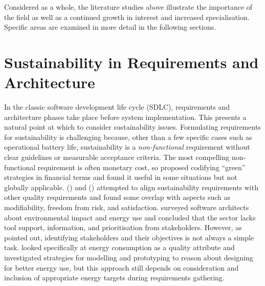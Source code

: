 Considered as a whole, the literature studies above illustrate the importance of the field as well as a continued growth in interest and increased specialisation. Specific areas are examined in more detail in the following sections.

\section{Sustainability in Requirements and Architecture}
\label{literature:requirements}

In the classic software development life cycle (SDLC), requirements and architecture phases take place before system implementation. This presents a natural point at which to consider sustainability issues. Formulating requirements for sustainability is challenging because, other than a few specific cases such as operational battery life, sustainability is a \emph{non-functional} requirement without clear guidelines or measurable acceptance criteria. The most compelling non-functional requirement is often monetary cost, so \citet{Gu2012} proposed codifying \enquote{green} strategies in financial terms and found it useful in some situations but not globally applicable. \citeauthor{Condori-Fernandez2018} (\citeyear{Condori-Fernandez2015}) and (\citeyear{Condori-Fernandez2018}) attempted to align sustainability requirements with other quality requirements and found some overlap with aspects such as modifiability, freedom from risk, and satisfaction. \citet{Bashroush2016} surveyed software architects about environmental impact and energy use and concluded that the sector lacks tool support, information, and prioritisation from stakeholders. However, as \citet{Penzenstadler2013a} pointed out, identifying stakeholders and their objectives is not always a simple task. \citet{Kazman2018} looked specifically at energy consumption as a quality attribute and investigated strategies for modelling and prototyping to reason about designing for better energy use, but this approach still depends on consideration and inclusion of appropriate energy targets during requirements gathering.

